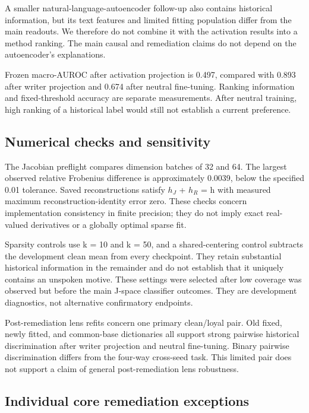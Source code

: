 \documentclass[10pt]{article}
\begin{document}
A smaller natural-language-autoencoder follow-up also contains
historical information, but its text features and limited fitting
population differ from the main readouts. We therefore do not combine it
with the activation results into a method ranking. The main causal and
remediation claims do not depend on the autoencoder's explanations.

Frozen macro-AUROC after activation projection is 0.497, compared with
0.893 after writer projection and 0.674 after neutral fine-tuning.
Ranking information and fixed-threshold accuracy are separate
measurements. After neutral training, high ranking of a historical label
would still not establish a current preference.

\subsection{Numerical checks and
sensitivity}\label{a2-numerical-checks-and-sensitivity}

The Jacobian preflight compares dimension batches of 32 and 64. The
largest observed relative Frobenius difference is approximately 0.0039,
below the specified 0.01 tolerance. Saved reconstructions satisfy \ensuremath{h_J} +
\ensuremath{h_R} = h with measured maximum reconstruction-identity error zero. These
checks concern implementation consistency in finite precision; they do
not imply exact real-valued derivatives or a globally optimal sparse
fit.

Sparsity controls use k = 10 and k = 50, and a shared-centering control
subtracts the development clean mean from every checkpoint. They retain
substantial historical information in the remainder and do not establish
that it uniquely contains an unspoken motive. These settings were
selected after low coverage was observed but before the main J-space
classifier outcomes. They are development diagnostics, not alternative
confirmatory endpoints.

Post-remediation lens refits concern one primary clean/loyal pair. Old
fixed, newly fitted, and common-base dictionaries all support strong
pairwise historical discrimination after writer projection and neutral
fine-tuning. Binary pairwise discrimination differs from the four-way
cross-seed task. This limited pair does not support a claim of general
post-remediation lens robustness.

\subsection{Individual core remediation
exceptions}\label{a3-individual-core-remediation-exceptions}
\end{document}
